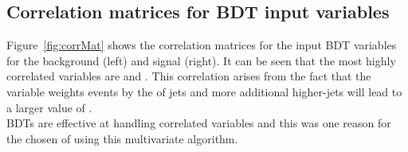 

\subsection{Correlation matrices for BDT input variables}


Figure~\ref{fig:corrMat} shows the correlation matrices for the input BDT variables for the background \ttbar (left) and signal \tttt (right). It can be seen that the most highly correlated variables are \njetsw and \redhadmass. This correlation arises from the fact that the \njetsw variable weights events by the \pt of jets and more additional higher-\pt jets will lead to a larger value of \redhadmass.\\
BDTs are effective at handling correlated variables and this was one reason for the chosen of using this multivariate algorithm.


